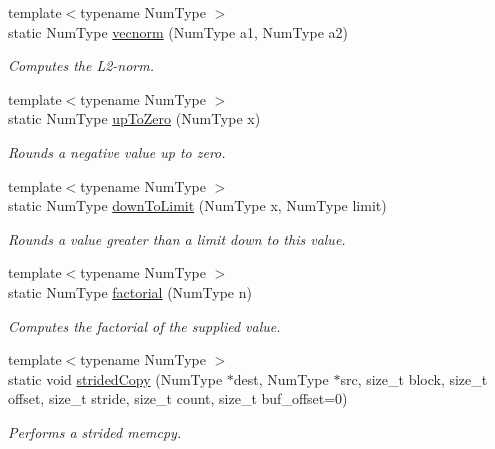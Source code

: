 \begin{DoxyCompactItemize}
{\footnotesize template$<$typename Num\+Type $>$ }\\static Num\+Type \hyperlink{class_grid_utils_a7a169fc043a585f20936b314def45fe7}{vecnorm} (Num\+Type a1, Num\+Type a2)
\begin{DoxyCompactList}\small\item\em Computes the L2-\/norm. \end{DoxyCompactList}\item 
{\footnotesize template$<$typename Num\+Type $>$ }\\static Num\+Type \hyperlink{class_grid_utils_a5a3e26a94e62833f0a9e5a4bda066dac}{up\+To\+Zero} (Num\+Type x)
\begin{DoxyCompactList}\small\item\em Rounds a negative value up to zero. \end{DoxyCompactList}\item 
{\footnotesize template$<$typename Num\+Type $>$ }\\static Num\+Type \hyperlink{class_grid_utils_abd4068e22339d5272ca551f8cbddec26}{down\+To\+Limit} (Num\+Type x, Num\+Type limit)
\begin{DoxyCompactList}\small\item\em Rounds a value greater than a limit down to this value. \end{DoxyCompactList}\item 
{\footnotesize template$<$typename Num\+Type $>$ }\\static Num\+Type \hyperlink{class_grid_utils_a57edeaeba2d67d187a9edd0b560fe0c2}{factorial} (Num\+Type n)
\begin{DoxyCompactList}\small\item\em Computes the factorial of the supplied value. \end{DoxyCompactList}\item 
{\footnotesize template$<$typename Num\+Type $>$ }\\static void \hyperlink{class_grid_utils_aa3ca6e20ef4fa927cb845956d7565b1e}{strided\+Copy} (Num\+Type $\ast$dest, Num\+Type $\ast$src, size\+\_\+t block, size\+\_\+t offset, size\+\_\+t stride, size\+\_\+t count, size\+\_\+t buf\+\_\+offset=0)
\begin{DoxyCompactList}\small\item\em Performs a strided memcpy. \end{DoxyCompactList}\end{DoxyCompactItemize}
